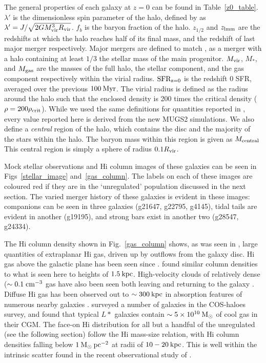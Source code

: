 The general properties of each galaxy at $z=0$ can be found in
Table~\ref{z0_table}.  $\lambda'$ is the dimensionless spin parameter of the
halo, defined by \citet{Bullock2001} as $\lambda'=J/\sqrt{2GM_{\rm vir}^3R_{\rm vir}}$.
$f_b$ is the baryon fraction of the halo.  $z_{1/2}$ and $z_{\rm lmm}$ are the
redshifts at which the halo reaches half of its final mass, and the redshift of
last major merger respectively.  Major mergers are defined to match
\citet{Stinson2010}, as a merger with a halo containing at least $1/3$ the
stellar mass of the main progenitor.  $M_{\rm vir}$, $M_*$, and $M_{\rm gas}$ are the
masses of the full halo, the stellar component, and the gas component
respectively within the virial radius.  $\rm{SFR_{\rm z=0}}$ is the redshift 0 
SFR, averaged over the previous $100\>{\rm Myr}$.  The virial radius
is defined as the radius around the halo such that the enclosed density is 200
times the critical density ($\rho=200\rho_{\rm crit}$).  While we used the same
definitions for quantities reported in \citet{Stinson2010}, every value reported
here is derived from the new MUGS2 simulations.  We also define a {\it central}
region of the halo, which contains the disc and the majority of the stars within
the halo.  The baryon mass within this region is given as $M_{\rm central}$  This
central region is simply a sphere of radius $0.1R_{\rm vir}$.

Mock stellar observations and {\sc Hi} column images of these galaxies can be
seen in Figs~\ref{stellar_image} and~\ref{gas_column}.  The labels on each of
these images are coloured red if they are in the `unregulated' population
discussed in the next section.  The varied merger history of these galaxies is
evident in these images: companions can be seen in three galaxies (g21647,
g22795, g4145), tidal tails are evident in another  (g19195), and strong bars
exist in another two (g28547, g24334).  

The {\sc Hi} column density shown in Fig.~\ref{gas_column} shows, as was seen in
\citet{Keller2015}, large quantities of extraplanar {\sc Hi} gas, driven up by
outflows from the galaxy disc.  {\sc Hi} gas above the galactic plane has been seen
since \citet{Muller1963}.  \citet{Lockman1984} found similar column densities to
what is seen here to heights of $1.5\>{\rm kpc}$.  High-velocity clouds of relatively
dense ($\sim0.1\; \rm{cm^{-3}}$ gas have also been seen both leaving and
returning to the galaxy \citep{Wakker1997}.  Diffuse {\sc Hi} gas has been observed
out to $\sim300\>{\rm kpc}$ in absorption features of numerous nearby galaxies
\citep{Wakker2009,Prochaska2011}.  \citet{Werk2014} surveyed a number of
galaxies in the COS-haloes survey, and found that typical $L*$ galaxies contain
$\sim5 \times10^{10}\>{\rm M_{\odot}}$ of cool gas in their CGM.  The face-on {\sc Hi}
distribution for all but a handful of the unregulated (see the following
section) follow the \citet{Broeils1997} {\sc Hi} mass-size relation, with {\sc Hi} column
densities falling below $1\>{\rm M_{\odot}}\>{\rm pc}^{-2}$ at radii of $10-20\>{\rm kpc}$.  This is well
within the intrinsic scatter found in the recent observational study of
\citet{Wang2016}.

